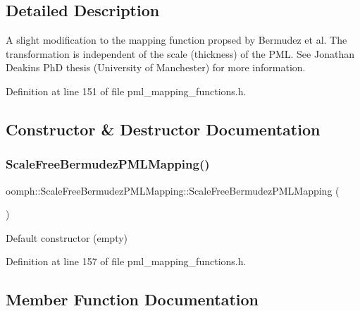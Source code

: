 \subsection{Detailed Description}
A slight modification to the mapping function propsed by Bermudez et al. The transformation is independent of the scale (thickness) of the P\+ML. See Jonathan Deakin\textquotesingle{}s PhD thesis (University of Manchester) for more information. 

Definition at line 151 of file pml\+\_\+mapping\+\_\+functions.\+h.



\subsection{Constructor \& Destructor Documentation}
\mbox{\label{classoomph_1_1ScaleFreeBermudezPMLMapping_a3d1003ec3f68660846773ea1dfa2c19c}} 
\subsubsection{\texorpdfstring{Scale\+Free\+Bermudez\+P\+M\+L\+Mapping()}{ScaleFreeBermudezPMLMapping()}}
{\footnotesize\ttfamily oomph\+::\+Scale\+Free\+Bermudez\+P\+M\+L\+Mapping\+::\+Scale\+Free\+Bermudez\+P\+M\+L\+Mapping (\begin{DoxyParamCaption}{ }\end{DoxyParamCaption})\hspace{0.3cm}{\ttfamily [inline]}}



Default constructor (empty) 



Definition at line 157 of file pml\+\_\+mapping\+\_\+functions.\+h.



\subsection{Member Function Documentation}
\mbox{\label{classoomph_1_1ScaleFreeBermudezPMLMapping_acb846023cc8a5c95b5ff807dfa404414}} 
